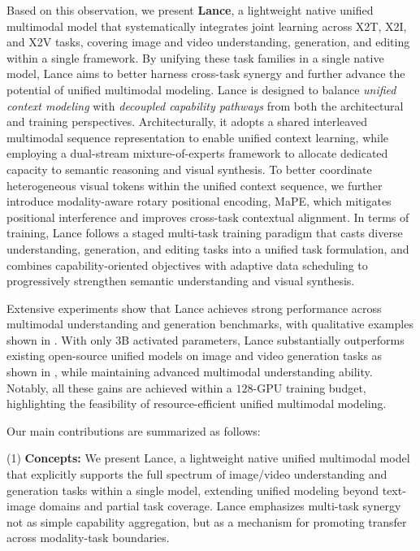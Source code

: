 \documentclass{llmxive}
\begin{document}
Based on this observation, we present \textbf{Lance}, a lightweight native unified multimodal model that systematically integrates joint learning across X2T, X2I, and X2V tasks, covering image and video understanding, generation, and editing within a single framework. 
By unifying these task families in a single native model, Lance aims to better harness cross-task synergy and further advance the potential of unified multimodal modeling.
Lance is designed to balance \textit{unified context modeling} with \textit{decoupled capability pathways} from both the architectural and training perspectives. 
Architecturally, it adopts a shared interleaved multimodal sequence representation to enable unified context learning, while employing a dual-stream mixture-of-experts framework to allocate dedicated capacity to semantic reasoning and visual synthesis.
 To better coordinate heterogeneous visual tokens within the unified context sequence, we further introduce modality-aware rotary positional encoding, MaPE, which mitigates positional interference and improves cross-task contextual alignment.
In terms of training, Lance follows a staged multi-task training paradigm that casts diverse understanding, generation, and editing tasks into a unified task formulation, and combines capability-oriented objectives with adaptive data scheduling to progressively strengthen semantic understanding and visual synthesis.

Extensive experiments show that Lance achieves strong performance across multimodal understanding and generation benchmarks, with qualitative examples shown in . With only $3$B activated parameters, Lance substantially outperforms existing open-source unified models on image and video generation tasks as shown in , while maintaining advanced multimodal understanding ability. Notably, all these gains are achieved within a $128$-GPU training budget, highlighting the feasibility of resource-efficient unified multimodal modeling.






Our main contributions are summarized as follows:

(1) \textbf{Concepts:} We present Lance, a lightweight native unified multimodal model that explicitly supports the full spectrum of image/video understanding and generation tasks within a single model, extending unified modeling beyond text-image domains and partial task coverage. Lance emphasizes multi-task synergy not as simple capability aggregation, but as a mechanism for promoting transfer across modality-task boundaries.
\end{document}
